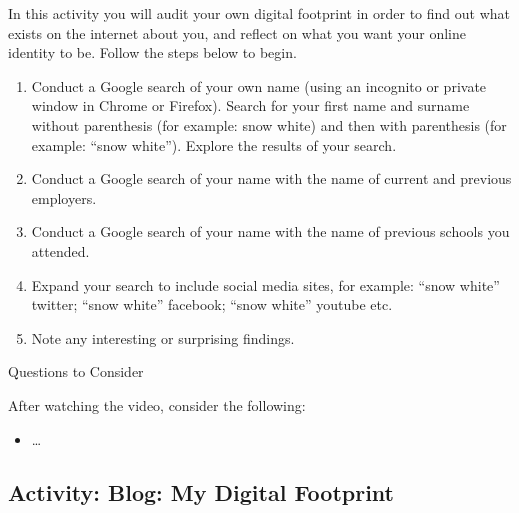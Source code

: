 \documentclass[
]{book}
\providecommand{\tightlist}{%
  \setlength{\itemsep}{0pt}\setlength{\parskip}{0pt}}
\theoremstyle{definition}
\theoremstyle{definition}
\theoremstyle{definition}
\theoremstyle{definition}
\theoremstyle{remark}
\begin{document}
\begin{reflect}
In this activity you will audit your own digital footprint in order to find out what exists on the internet about you, and reflect on what you want your online identity to be. Follow the steps below to begin.

\begin{enumerate}
\def\labelenumi{\arabic{enumi}.}
\tightlist
\item
  Conduct a Google search of your own name (using an incognito or private window in Chrome or Firefox). Search for your first name and surname without parenthesis (for example: snow white) and then with parenthesis (for example: ``snow white''). Explore the results of your search.
\item
  Conduct a Google search of your name with the name of current and previous employers.
\item
  Conduct a Google search of your name with the name of previous schools you attended.
\item
  Expand your search to include social media sites, for example: ``snow white'' twitter; ``snow white'' facebook; ``snow white'' youtube etc.
\item
  Note any interesting or surprising findings.
\end{enumerate}

{Questions to Consider}

After watching the video, consider the following:

\begin{itemize}
\tightlist
\item
  \ldots{}
\end{itemize}
\end{reflect}

\hypertarget{activity-blog-my-digital-footprint}{%
\subsection*{Activity: Blog: My Digital Footprint}\label{activity-blog-my-digital-footprint}}
\end{document}
